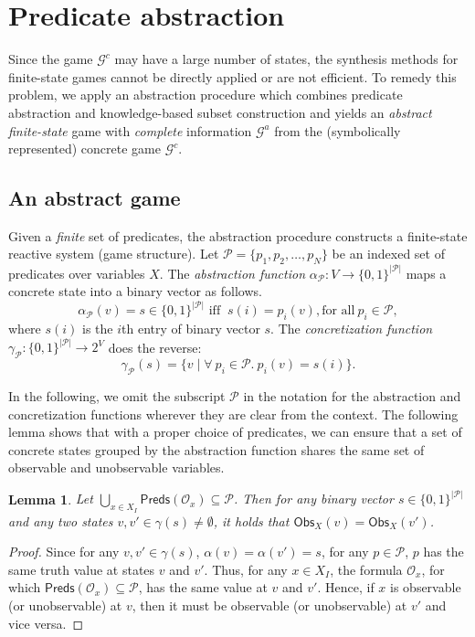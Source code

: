 \documentclass[letterpaper, 10 pt, conference]{ieeeconf}
\newtheorem{lemma}{Lemma}
\providecommand{\abs}[1]{\lvert#1\rvert}
\begin{document}
\section{Predicate abstraction}

Since the game $\mathcal{G}^c$ may have a large number of states, the synthesis methods for finite-state games cannot be directly applied or are not efficient. To remedy this problem, we apply an abstraction procedure which combines predicate abstraction and knowledge-based
subset construction and yields an
\emph{abstract finite-state} game with \emph{complete} information $\mathcal{G}^a$
from the (symbolically represented) concrete game $\mathcal{G}^c$.

\subsection{An abstract game}

Given a \emph{finite} set of predicates, the  abstraction procedure
constructs a finite-state reactive system (game structure).  
Let
$\mathcal{P}=\{p_1,p_2,\ldots,p_{N}\} $ be an indexed set of
predicates over variables $X$.  The \emph{abstraction function}
$\alpha _{\mathcal{P}}: V\rightarrow \{0,1\}^{\abs{\mathcal{P}}}$ maps
a concrete state into a binary vector as
follows. \[
\alpha _{\mathcal{P}} (v)= s \in \{0,1\}^{\abs{\mathcal{P}}} \text{ iff }\ s(i)=p_i(v),
\textrm{for all}\ p_i\in \mathcal{P},
\]
where $s(i)$ is the $i$th entry of binary vector $s$.  The  \emph{concretization function} $\gamma_{\mathcal{P}}:
\{0,1\}^{\abs{\mathcal{P}}} \rightarrow 2^V $ does the reverse:
\[ \gamma_{\mathcal{P}}(s)= \{v\mid \forall\ p_i\in \mathcal{P}.\ 
p_i(v)= s(i)\}.
\] 

In the following, we omit the subscript $\mathcal{P}$ in the notation
for the abstraction and concretization functions wherever they are
clear from the context.  The following lemma shows that with a proper
choice of predicates, we can ensure that a set of concrete states
grouped by the abstraction function shares the same set of observable
and unobservable variables.
\begin{lemma}
\label{lm1}
Let $\bigcup_{x\in X_I} \mathsf{Preds} (\mathcal{O}_x)\subseteq
\mathcal{P}$. Then for any binary vector $s \in
\{0,1\}^{\abs{\mathcal{P}}}$ and any two states $v,v'\in \gamma(s) \ne
\emptyset$, it holds that $
\mathsf{Obs}_X(v) = \mathsf{Obs}_X(v')$.
\end{lemma}
\begin{proof}Since for any $v,v'\in \gamma( s)$, $\alpha(v)=\alpha(v')=s$, 
  for any $p\in \mathcal{P}$, $p$ has the same truth value at states $v
  $ and $v'$. Thus, for any $x\in X_I$, the formula
  $\mathcal{O}_x$, for which $\mathsf{Preds}(\mathcal{O}_x)\subseteq\mathcal{P}$, has the same
  value at $v$ and $v'$. Hence, if $x$ is observable (or
  unobservable) at $v$, then it must be observable (or unobservable)
  at $v'$ and vice versa. 
\end{proof}
\end{document}
